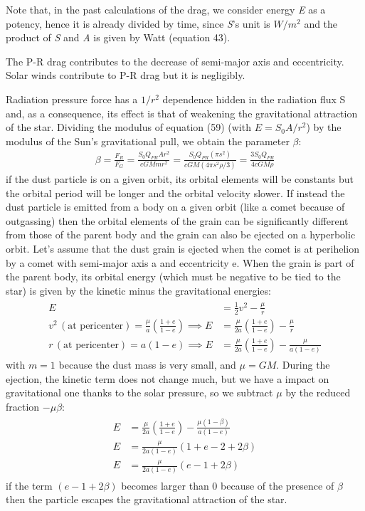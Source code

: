 \documentclass[12pt,a4paper]{article}
\begin{document}
Note that, in the past calculations of the drag, we consider energy \textit{E} as a potency, hence it is already divided by time, since \textit{S}'s unit is $W/m^2$ and the product of \textit{S} and \textit{A} is given by Watt (equation 43).

The P-R drag contributes to the decrease of semi-major axis and eccentricity. Solar winds contribute to P-R drag but it is negligibly. 

Radiation pressure force has a $1/r^2$ dependence hidden in the radiation flux S and, as a consequence, its effect is that of weakening the gravitational attraction of the star. Dividing the modulus of equation (59) (with $E=S_0A/r^2$) by the modulus of the Sun's gravitational pull, we obtain the parameter $\beta$:
\begin{align}
    \beta=\frac{F_R}{F_G}=\frac{S_0Q_{PR}Ar^2}{cGMmr^2}=\frac{S_0Q_{PR}(\pi s^2)}{cGM(4\pi s^2\rho/3)}=\frac{3S_0Q_{PR}}{4cGM\rho}
\end{align}
if the dust particle is on a given orbit, its orbital elements will be constants but the orbital period will be longer and the orbital velocity slower. If instead the dust particle is emitted from a body on a given orbit (like a comet because of outgassing) then the orbital elements of the grain can be significantly different from those of the parent body and the grain can also be ejected on a hyperbolic orbit. Let's assume that the dust grain is ejected when the comet is at perihelion by a comet with semi-major axis a and eccentricity e. When the grain is part of the parent body, its orbital energy (which must be negative to be tied to the star) is given by the kinetic minus the gravitational energies:
\begin{align}
\begin{split}
    E&=\frac{1}{2}v^2-\frac{\mu}{r} \\
    v^2\,(\textrm{at pericenter})=\frac{\mu}{a}(\frac{1+e}{1-e})\implies E&=\frac{\mu}{2a}(\frac{1+e}{1-e})-\frac{\mu}{r} \\
    r\,(\textrm{at pericenter})=a(1-e)\implies E&=\frac{\mu}{2a}(\frac{1+e}{1-e})-\frac{\mu}{a(1-e)}
    \end{split}
\end{align}
with $m=1$ because the dust mass is very small, and $\mu=GM$. During the ejection, the kinetic term does not change much, but we have a impact on gravitational one thanks to the solar pressure, so we subtract $\mu$ by the reduced fraction $-\mu\beta$:
\begin{align}
\begin{split}
    E&=\frac{\mu}{2a}(\frac{1+e}{1-e})-\frac{\mu(1-\beta)}{a(1-e)} \\
    E&=\frac{\mu}{2a(1-e)}(1+e-2+2\beta) \\
    E&=\frac{\mu}{2a(1-e)}(e-1+2\beta)
\end{split}
\end{align}
if the term $(e-1+2\beta)$ becomes larger than 0 because of the presence of $\beta$ then the particle escapes the gravitational attraction of the star.
\end{document}
